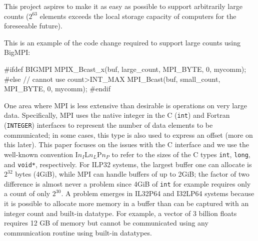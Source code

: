 This project aspires to make it as easy as possible to support arbitrarily
large counts ($2^{63}$ elements exceeds the local storage capacity of computers
for the foreseeable future).

This is an example of the code change required to support large counts using
BigMPI:
\begin{code}
#ifdef BIGMPI
    MPIX_Bcast_x(buf, large_count, MPI_BYTE, 0, mycomm);
#else // cannot use count>INT_MAX
    MPI_Bcast(buf, small_count, MPI_BYTE, 0, mycomm);
#endif
\end{code}




One area where MPI is less extensive than desirable is operations on very large data.
Specifically, MPI uses the native integer in the C (\texttt{int}) and Fortran (\texttt{INTEGER})
interfaces to represent the number of data elements to be communicated;
in some cases, this type is also used to express an offset (more on this later).  
This paper focuses on the issues with the C interface and we use the
well-known convention I$n_{I}$L$n_{L}$P$n_{P}$ to refer to the sizes
of the C types \texttt{int}, \texttt{long}, and \texttt{void*}, respectively.
For ILP32 systems, the largest buffer one can allocate is $2^{32}$ bytes (4GiB),
while MPI can handle buffers of up to 2GiB; the factor of two difference is
almost never a problem since 4GiB of \texttt{int} for example requires only
a count of only $2^{30}$.
A problem emerges in IL32P64 and I32LP64 systems because it is possible to allocate
more memory in a buffer than can be captured with an integer count and built-in datatype.
For example, a vector of 3 billion floats requires 12 GB of memory but cannot be 
communicated using any communication routine using built-in datatypes.

